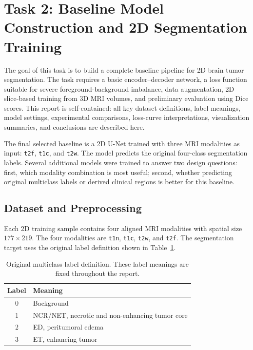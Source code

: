 \section{Task 2: Baseline Model Construction and 2D Segmentation Training}

The goal of this task is to build a complete baseline pipeline for 2D brain tumor segmentation. The task requires a basic encoder--decoder network, a loss function suitable for severe foreground-background imbalance, data augmentation, 2D slice-based training from 3D MRI volumes, and preliminary evaluation using Dice scores. This report is self-contained: all key dataset definitions, label meanings, model settings, experimental comparisons, loss-curve interpretations, visualization summaries, and conclusions are described here.

The final selected baseline is a 2D U-Net trained with three MRI modalities as input: \texttt{t2f}, \texttt{t1c}, and \texttt{t2w}. The model predicts the original four-class segmentation labels. Several additional models were trained to answer two design questions: first, which modality combination is most useful; second, whether predicting original multiclass labels or derived clinical regions is better for this baseline.

\subsection{Dataset and Preprocessing}

Each 2D training sample contains four aligned MRI modalities with spatial size \(177 \times 219\). The four modalities are \texttt{t1n}, \texttt{t1c}, \texttt{t2w}, and \texttt{t2f}. The segmentation target uses the original label definition shown in Table~\ref{tab:labeldef}.

\begin{table}[h]
\centering
\begin{tabular}{cl}
\hline
Label & Meaning \\
\hline
0 & Background \\
1 & NCR/NET, necrotic and non-enhancing tumor core \\
2 & ED, peritumoral edema \\
3 & ET, enhancing tumor \\
\hline
\end{tabular}
\caption{Original multiclass label definition. These label meanings are fixed throughout the report.}
\label{tab:labeldef}
\end{table}

